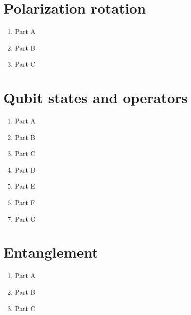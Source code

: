 \documentclass[12pt]{article}
\begin{document}
\newcommand{\ket}[1]{|#1 \rangle}
\newcommand{\normtwo}{\frac{1}{\sqrt{2}}}

\setcounter{section}{0}
\section{Polarization rotation}

\begin{enumerate}

\item
Part A

\item
Part B

\item
Part C

\end{enumerate}

\pagebreak

\setcounter{section}{1}
\section{Qubit states and operators}

\begin{enumerate}

\item
Part A

\item
Part B

\item
Part C

\item
Part D

\item
Part E

\item
Part F

\item
Part G

\end{enumerate}

\pagebreak

\section{Entanglement}

\begin{enumerate}

\item
Part A

\item
Part B

\item
Part C

\end{enumerate}
\end{document}
